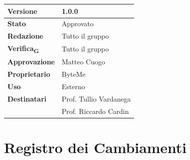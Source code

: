 \documentclass[11pt,a4paper]{article}
\newcommand{\gls}[1]{#1\textsubscript{G}}
\begin{document}
\begin{titlepage}
    \begin{table}[H]
        \centering
        \begin{tabular}{|l|p{5cm}|}
            \hline
            \textbf{Versione} & 1.0.0 \\
            \hline
            \textbf{Stato} & Approvato \\
            \hline
            \textbf{Redazione} & Tutto il gruppo \\
            \hline
            \textbf{\gls{Verifica}} & Tutto il gruppo \\
            \hline
            \textbf{Approvazione} & Matteo Cuogo \\
            \hline
            \textbf{Proprietario} & ByteMe \\
            \hline
            \textbf{Uso} & Esterno \\
            \hline
            \textbf{Destinatari} & Prof. Tullio Vardanega \\ & Prof. Riccardo Cardin \\
            \hline
        \end{tabular}
    \end{table}
    
    \vfill
\end{titlepage}

\section*{Registro dei Cambiamenti}
\end{document}
